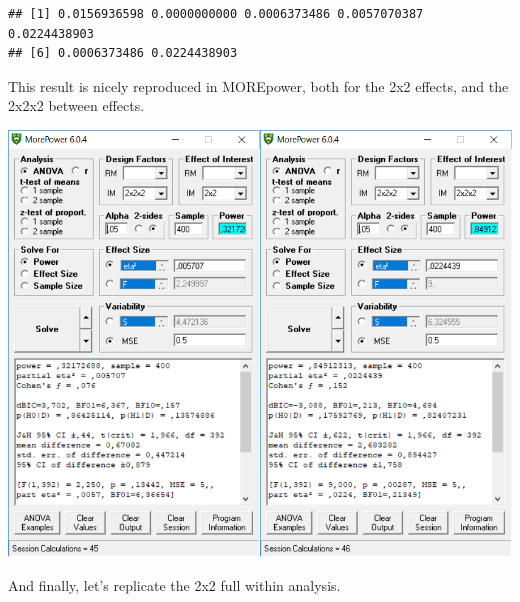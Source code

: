 \documentclass[
]{book}
\newenvironment{Shaded}{\begin{snugshade}}{\end{snugshade}}
\newcommand{\NormalTok}[1]{#1}
\newcommand{\OperatorTok}[1]{\textcolor[rgb]{0.81,0.36,0.00}{\textbf{#1}}}
\begin{document}
\begin{Shaded}
\end{Shaded}

\begin{verbatim}
## [1] 0.0156936598 0.0000000000 0.0006373486 0.0057070387 0.0224438903
## [6] 0.0006373486 0.0224438903
\end{verbatim}

This result is nicely reproduced in MOREpower, both for the 2x2 effects, and the 2x2x2 between effects.

\includegraphics{screenshots/morepower_5.png}

And finally, let's replicate the 2x2 full within analysis.
\end{document}

